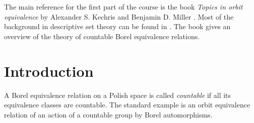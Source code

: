 \documentclass[10pt]{amsart}
\theoremstyle{definition}
\theoremstyle{remark}
\begin{document}
The main reference for the first part of the course is the book \emph{Topics in orbit equivalence} by Alexander S. Kechris and Benjamin D. Miller \cite{MR2095154}. 
Most of the background in descriptive set theory can be found in \cite{MR2455198, MR1321597}. 
The book \cite{Kechris2019} gives an overview of the theory of countable Borel equivalence relations. 


%
%
%







\section{Introduction} 

A Borel equivalence relation on a Polish space is called \emph{countable} if all its equivalence classes are countable. 
The standard example is an orbit equivalence relation of an action of a countable group by Borel automorphisms. 
\end{document}
